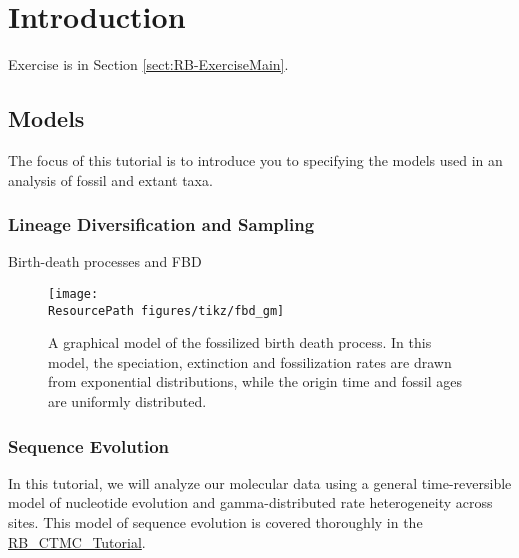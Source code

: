 
\section{Introduction}\label{subsub:Intro-Main}

\citet{Ronquist2012a} 

Exercise is in Section \ref{sect:RB-ExerciseMain}.

\subsection{Models}\label{subsect:Intro-Models}

The focus of this tutorial is to introduce you to specifying the models used in an analysis of fossil and extant taxa. 

\begin{figure}[h!]
\centering
{}
\caption{\small  }
\label{fig:fbd_gm}
\end{figure}


\subsubsection{Lineage Diversification and Sampling}\label{subsub:Intro-FBD}

Birth-death processes and FBD

\begin{figure}[h!]
\centering
\texttt{[image: \\ResourcePath figures/tikz/fbd\_gm]}
\caption{\small A graphical model of the fossilized birth death process. In this model, the speciation, extinction and fossilization rates are drawn from exponential distributions, while the origin time and fossil ages are uniformly distributed. }
\label{fig:fbd_gm}
\end{figure}


\subsubsection{Sequence Evolution}\label{subsub:Intro-GTR}

In this tutorial, we will analyze our molecular data using a general time-reversible model of nucleotide evolution and gamma-distributed rate heterogeneity across sites.
This model of sequence evolution is covered thoroughly in the \href{https://github.com/revbayes/revbayes_tutorial/raw/master/tutorial_TeX/RB_CTMC_Tutorial/RB_CTMC_Tutorial.pdf}{RB\_CTMC\_Tutorial}.

